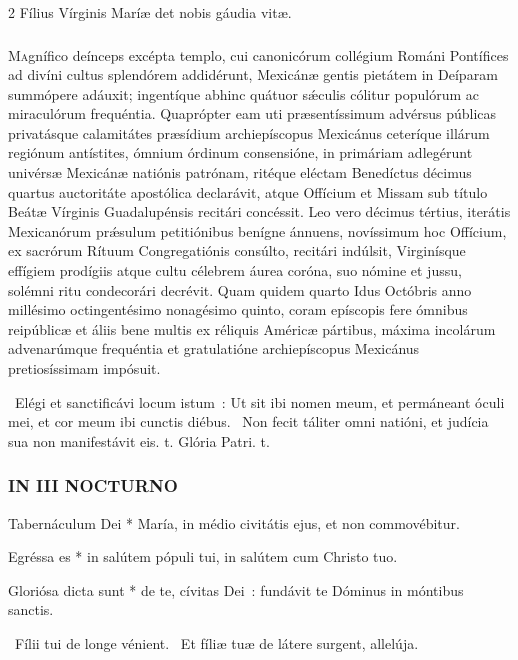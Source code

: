 \documentclass[9pt,twoside]{extarticle}
\begin{document}
\begin{multicols}{2}
\medskip
\small {} Fílius Vírginis Maríæ det nobis gáudia vitæ.

\normalsize
\subsubsection*{\center {}}
\lettrine{M}{a}gnífico deínceps excépta templo, cui canonicórum collégium Románi Pontífices ad divíni cultus splendórem addidérunt, Mexicánæ gentis pietátem in Deíparam summópere adáuxit; ingentíque abhinc quátuor sǽculis cólitur populórum ac miraculórum frequéntia. Quaprópter eam uti præsentíssimum advérsus públicas privatásque calamitátes præsídium archiepíscopus Mexicánus ceteríque illárum regiónum antístites, ómnium órdinum consensióne, in primáriam adlegérunt univérsæ Mexicánæ natiónis patrónam, ritéque eléctam Benedíctus décimus quartus auctoritáte apostólica declarávit, atque Offícium et Missam sub título Beátæ Vírginis Guadalupénsis recitári concéssit. Leo vero décimus tértius, iterátis Mexicanórum prǽsulum petitiónibus benígne ánnuens, novíssimum hoc Offícium, ex sacrórum Rítuum Congregatiónis consúlto, recitári indúlsit, Virginísque effígiem prodígiis atque cultu célebrem áurea coróna, suo nómine et jussu, solémni ritu condecorári decrévit. Quam quidem quarto Idus Octóbris anno millésimo octingentésimo nonagésimo quinto, coram epíscopis fere ómnibus reipúblicæ et áliis bene multis ex réliquis Américæ pártibus, máxima incolárum advenarúmque frequéntia et gratulatióne archiepíscopus Mexicánus pretiosíssimam impósuit.

\smallskip
{}~Elégi et sanctificávi locum istum~: \textred{*} Ut sit ibi nomen meum, et permáneant óculi mei, et cor meum ibi cunctis diébus.
~Non fecit táliter omni natióni, et judícia sua non manifestávit eis. t. Glória Patri. t.
\subsubsection*{\center \normalfont \textsc{IN III NOCTURNO}}

\smallskip
{} Tabernáculum Dei * María, in médio civitátis ejus, et non commovébitur.

 Egréssa es * in salútem pópuli tui, in salútem cum Christo tuo.

 Gloriósa dicta sunt * de te, cívitas Dei~: fundávit te Dóminus in móntibus sanctis.

\smallskip
{}~Fílii tui de longe vénient. ~Et fíliæ tuæ de látere surgent, allelúja.


\end{multicols}
\end{document}
